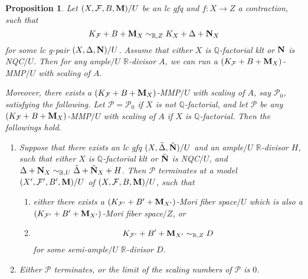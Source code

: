 \documentclass[11pt]{amsart}
\numberwithin{equation}{section}
\newcommand{\Mm}{{\bf{M}}}
\newcommand{\Nn}{{\bf{N}}}
\newcommand{\Qq}{\mathbb{Q}}
\newcommand{\Rr}{\mathbb{R}}
\newcommand{\Ff}{\mathcal{F}}
\newtheorem{prop}[thm]{Proposition}
\theoremstyle{definition}
\theoremstyle{definition}
\theoremstyle{definition}
\begin{document}
\begin{prop}\label{prop: run mmp with scaling gfq}
Let $(X,\Ff,B,\Mm)/U$ be an lc gfq and $f: X\rightarrow Z$ a contraction, such that 
$$K_{\Ff}+B+\Mm_X\sim_{\mathbb R,Z}K_X+\Delta+\Nn_X$$
for some lc g-pair $(X,\Delta,\Nn)/U$. Assume that either $X$ is $\Qq$-factorial klt or $\Nn$ is NQC$/U$. Then for any ample$/U$ $\Rr$-divisor $A$, we can run a $(K_{\Ff}+B+\Mm_X)$-MMP$/U$ with scaling of $A$. 

Moreover, there exists a $(K_{\Ff}+B+\Mm_X)$-MMP$/U$ with scaling of $A$, say $\mathcal{P}_0$, satisfying the following. Let $\mathcal{P}=\mathcal{P}_0$ if $X$ is not $\Qq$-factorial, and let $\mathcal{P}$ be any $(K_{\Ff}+B+\Mm_X)$-MMP$/U$ with scaling of $A$ if $X$ is $\Qq$-factorial. Then the followings hold.
\begin{enumerate}
  \item Suppose that there exists an lc gfq $(X,\tilde\Delta,\tilde\Nn)/U$ and an ample$/U$ $\Rr$-divisor $H$, such that either $X$ is $\Qq$-factorial klt or $\tilde\Nn$ is NQC$/U$, and $\Delta+\Nn_X\sim_{\mathbb R,U}\tilde\Delta+\tilde\Nn_X+H$. Then $\mathcal{P}$ terminates at a model $(X',\Ff',B',\Mm)/U$ of $(X,\Ff,B,\Mm)/U$, such that
  \begin{enumerate}
    \item either there exists a $(K_{\Ff'}+B'+\Mm_{X'})$-Mori fiber space$/U$ which is also a $(K_{\Ff'}+B'+\Mm_{X'})$-Mori fiber space$/Z$, or 
    \item $$K_{\Ff'}+B'+\Mm_{X'}\sim_{\mathbb R,Z}D$$ 
    for some semi-ample$/U$ $\Rr$-divisor $D$.
  \end{enumerate}
  \item  Either $\mathcal{P}$ terminates, or the limit of the scaling numbers of $\mathcal{P}$ is $0$. 
\end{enumerate}
\end{prop}
\end{document}
